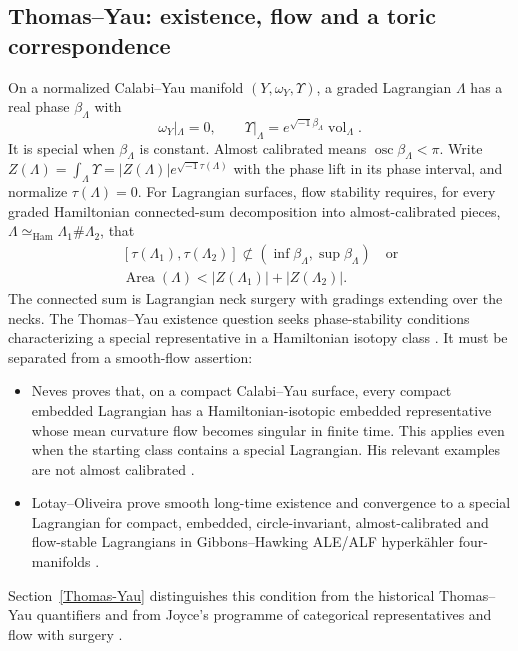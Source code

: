 \documentclass[12pt,reqno]{amsart}
\numberwithin{equation}{section}
\theoremstyle{plain}
\theoremstyle{definition}
\begin{document}
\subsection{Thomas--Yau: existence, flow and a toric correspondence}
\label{intro-Thomas-Yau}
On a normalized Calabi--Yau manifold $(Y,\omega_Y,\Upsilon)$, a graded
Lagrangian $\Lambda$ has a real phase $\beta_\Lambda$ with
\[
 \omega_Y|_\Lambda=0,\qquad
 \Upsilon|_\Lambda=e^{\sqrt{-1}\beta_\Lambda}\operatorname{vol}_\Lambda.
\]
It is special when $\beta_\Lambda$ is constant. Almost calibrated means
$\operatorname{osc}\beta_\Lambda<\pi$. Write
$Z(\Lambda)=\int_\Lambda\Upsilon=|Z(\Lambda)|e^{\sqrt{-1}\tau(\Lambda)}$
with the phase lift in its phase interval, and normalize
$\tau(\Lambda)=0$. For Lagrangian surfaces, flow stability requires, for every graded
Hamiltonian connected-sum decomposition into almost-calibrated pieces,
$\Lambda\simeq_{\mathrm{Ham}}\Lambda_1\#\Lambda_2$, that
\[
 \begin{gathered}
 [\tau(\Lambda_1),\tau(\Lambda_2)]
 \not\subset(\inf\beta_\Lambda,\sup\beta_\Lambda)
 \quad\text{or}\\
 \operatorname{Area}(\Lambda)
 <|Z(\Lambda_1)|+|Z(\Lambda_2)|.
 \end{gathered}
\]
The connected sum is Lagrangian neck surgery with gradings extending
over the necks. 
The Thomas--Yau
existence question seeks phase-stability conditions characterizing a
special representative in a Hamiltonian isotopy class
\cite[Section 1]{TY02}. It must be separated from a smooth-flow assertion:
\begin{itemize}
\item Neves proves that, on a compact Calabi--Yau surface, every compact
embedded Lagrangian has a Hamiltonian-isotopic embedded representative
whose mean curvature flow becomes singular in finite time. This applies
even when the starting class contains a special Lagrangian. His relevant
examples are not almost calibrated \cite[Theorem 6.1 and Remark 1.3]{Nev13}.
\item Lotay--Oliveira prove smooth long-time existence and convergence
to a special Lagrangian for compact, embedded, circle-invariant,
almost-calibrated and flow-stable Lagrangians in Gibbons--Hawking
ALE/ALF hyperk\"ahler four-manifolds \cite[Theorem 1.2]{LO24}.
\end{itemize}
Section~\ref{Thomas-Yau} distinguishes this condition
from the historical Thomas--Yau quantifiers and from Joyce's programme
of categorical representatives and flow with surgery \cite{Joy15}.
\end{document}
